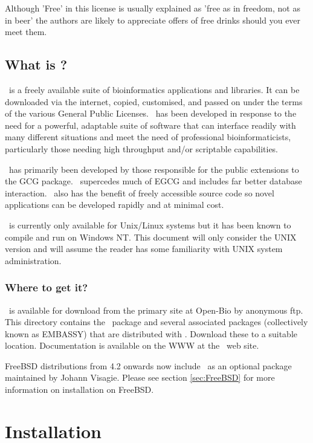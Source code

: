 \documentclass{report}
\begin{document}
Although 'Free' in this license is usually explained as 'free as in
freedom, not as in beer' the authors are likely to appreciate offers
of free drinks should you ever meet them.
\section{What is \EMBOSS?}

\EMBOSS\ is a freely available suite of bioinformatics applications
and libraries. It can be downloaded via the internet, copied,
customised, and passed on under the terms of the various General
Public Licenses.  \EMBOSS\ has been developed in response to the need
for a powerful, adaptable suite of software that can interface readily
with many different situations and meet the need of professional
bioinformaticists, particularly those needing high throughput and/or
scriptable capabilities.

\EMBOSS\ has primarily been developed by those responsible for the
public extensions to the GCG package. \EMBOSS\ supercedes much of EGCG
and includes far better database interaction. \EMBOSS\ also has the
benefit of freely accessible source code so novel applications can be
developed rapidly and at minimal cost.

\EMBOSS\ is currently only available for Unix/Linux systems but it has
been known to compile and run on Windows NT. This document will only
consider the UNIX version and will assume the reader has some
familiarity with UNIX system administration.

\subsection{Where to get it?}

\EMBOSS\ is available for download from the primary site at Open-Bio
by anonymous ftp. This
directory contains the \EMBOSS\ package and several associated
packages (collectively known as EMBASSY) that are distributed with
\EMBOSS. Download these to a suitable location. Documentation is
available on the WWW at the \EMBOSS\ web
site.

FreeBSD distributions from 4.2 onwards now include \EMBOSS\ as an
optional package maintained by Johann
Visagie. Please see section
\ref{sec:FreeBSD} for more information on installation on FreeBSD.

\chapter{Installation}
\end{document}
